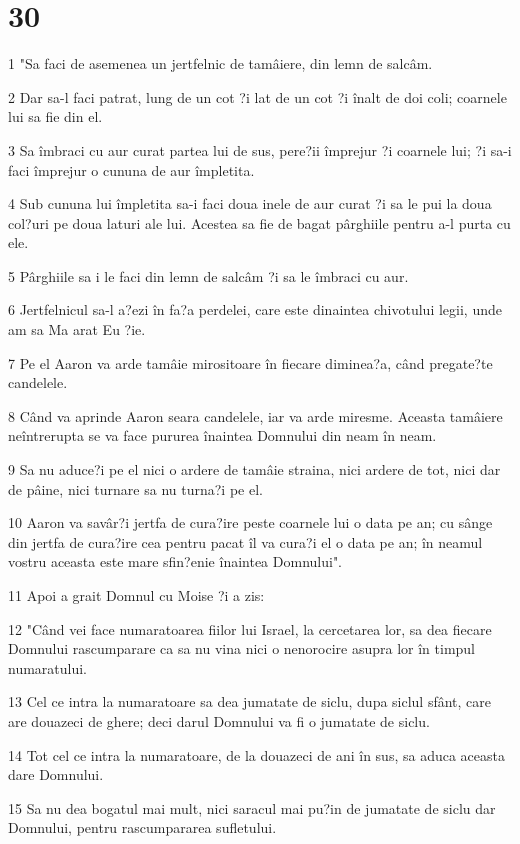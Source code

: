 \chapter{30}

\par 1 "Sa faci de asemenea un jertfelnic de tamâiere, din lemn de salcâm.
\par 2 Dar sa-l faci patrat, lung de un cot ?i lat de un cot ?i înalt de doi coli; coarnele lui sa fie din el.
\par 3 Sa îmbraci cu aur curat partea lui de sus, pere?ii împrejur ?i coarnele lui; ?i sa-i faci împrejur o cununa de aur împletita.
\par 4 Sub cununa lui împletita sa-i faci doua inele de aur curat ?i sa le pui la doua col?uri pe doua laturi ale lui. Acestea sa fie de bagat pârghiile pentru a-l purta cu ele.
\par 5 Pârghiile sa i le faci din lemn de salcâm ?i sa le îmbraci cu aur.
\par 6 Jertfelnicul sa-l a?ezi în fa?a perdelei, care este dinaintea chivotului legii, unde am sa Ma arat Eu ?ie.
\par 7 Pe el Aaron va arde tamâie mirositoare în fiecare diminea?a, când pregate?te candelele.
\par 8 Când va aprinde Aaron seara candelele, iar va arde miresme. Aceasta tamâiere neîntrerupta se va face pururea înaintea Domnului din neam în neam.
\par 9 Sa nu aduce?i pe el nici o ardere de tamâie straina, nici ardere de tot, nici dar de pâine, nici turnare sa nu turna?i pe el.
\par 10 Aaron va savâr?i jertfa de cura?ire peste coarnele lui o data pe an; cu sânge din jertfa de cura?ire cea pentru pacat îl va cura?i el o data pe an; în neamul vostru aceasta este mare sfin?enie înaintea Domnului".
\par 11 Apoi a grait Domnul cu Moise ?i a zis:
\par 12 "Când vei face numaratoarea fiilor lui Israel, la cercetarea lor, sa dea fiecare Domnului rascumparare ca sa nu vina nici o nenorocire asupra lor în timpul numaratului.
\par 13 Cel ce intra la numaratoare sa dea jumatate de siclu, dupa siclul sfânt, care are douazeci de ghere; deci darul Domnului va fi o jumatate de siclu.
\par 14 Tot cel ce intra la numaratoare, de la douazeci de ani în sus, sa aduca aceasta dare Domnului.
\par 15 Sa nu dea bogatul mai mult, nici saracul mai pu?in de jumatate de siclu dar Domnului, pentru rascumpararea sufletului.
